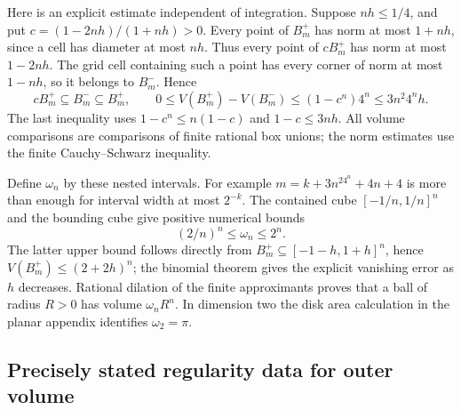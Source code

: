 Here is an explicit estimate independent of integration. Suppose
\(nh\leq1/4\), and put
\(c=(1-2nh)/(1+nh)>0\).
Every point of \(B_m^+\) has norm at most \(1+nh\), since a cell has
diameter at most \(nh\). Thus every point of \(cB_m^+\) has norm at
most \(1-2nh\). The grid cell containing such a point has every corner
of norm at most \(1-nh\), so it belongs to \(B_m^-\). Hence
\[
 cB_m^+\subseteq B_m^-\subseteq B_m^+,
 \qquad
 0\leq V(B_m^+)-V(B_m^-)
 \leq (1-c^n)4^n\leq3n^2 4^n h.
\]
The last inequality uses \(1-c^n\leq n(1-c)\) and
\(1-c\leq3nh\). All volume comparisons are comparisons of finite
rational box unions; the norm estimates use the finite Cauchy--Schwarz
inequality.

Define \(\omega_n\) by these nested intervals. For example
\(m=k+3n^24^n+4n+4\) is more than enough for interval width at most
\(2^{-k}\). The contained cube \([-1/n,1/n]^n\) and the bounding cube
give positive numerical bounds
\[
 (2/n)^n\leq\omega_n\leq 2^n.
\]
The latter upper bound follows directly from
\(B_m^+\subseteq[-1-h,1+h]^n\), hence
\(V(B_m^+)\leq(2+2h)^n\); the binomial theorem gives the explicit
vanishing error as \(h\) decreases. Rational dilation of the
finite approximants proves that a ball of radius \(R>0\) has volume
\(\omega_nR^n\). In dimension two the disk area calculation in the
planar appendix identifies \(\omega_2=\pi\).

\subsection{Precisely stated regularity data for outer volume}

